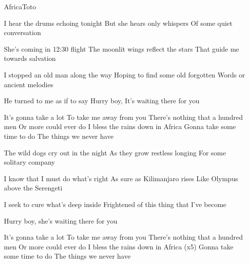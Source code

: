 \begin{Song}{Africa}{Toto}
\begin{multicols}{2}
\begin{Verse}
I hear the drums echoing tonight
But she hears only whispers
Of some quiet conversation
\espaceInterStrophe

She's coming in 12:30 flight
The moonlit wings reflect the stars
That guide me towards salvation
\espaceInterStrophe

I stopped an old man along the way
Hoping to find some old forgotten
Words or ancient melodies
\espaceInterStrophe

He turned to me as if to say
Hurry boy, It's waiting there for you
\end{Verse}
\espaceInterStrophe

\begin{Chorus}
It's gonna take a lot
To take me away from you
There's nothing that a hundred men
Or more could ever do
I bless the rains down in Africa
Gonna take some time to do
The things we never have
\end{Chorus}
\vfill
\columnbreak

\begin{Verse}
The wild dogs cry out in the night
As they grow restless longing
For some solitary company
\espaceInterStrophe

I know that I must do what's right
As sure as Kilimanjaro rises
Like Olympus above the Serengeti
\espaceInterStrophe

I seek to cure what's deep inside
Frightened of this thing that I've become
\end{Verse}
\espaceInterStrophe

\tochorus
\espaceInterStrophe

\espaceInterStrophe

\begin{Verse}
Hurry boy, she's waiting there for you
\end{Verse}
\espaceInterStrophe

\begin{Chorus}
It's gonna take a lot
To take me away from you
There's nothing that a hundred men
Or more could ever do
I bless the rains down in Africa (x5)
Gonna take some time to do
The things we never have
\end{Chorus}
\end{multicols}

\vfill

\begin{multicols}{2}


\end{multicols}
\end{Song}
